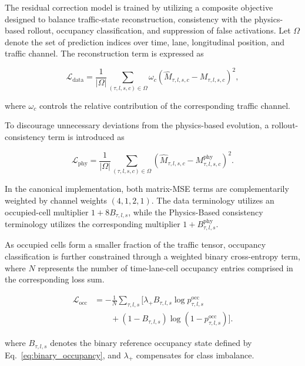 \documentclass[journal]{IEEEtran}
\begin{document}
The residual correction model is trained by utilizing a composite objective designed to balance traffic-state reconstruction, consistency with the physics-based rollout, occupancy classification, and suppression of false activations. Let $\Omega$ denote the set of prediction indices over time, lane, longitudinal position, and traffic channel. The reconstruction term is expressed as

\begin{equation}
\mathcal{L}_{\mathrm{data}}
=
\frac{1}{|\Omega|}
\sum_{(\tau,l,s,c)\in\Omega}
\omega_c
\left(
\widehat{M}_{\tau,l,s,c}
-
M_{\tau,l,s,c}
\right)^2,
\end{equation}

where $\omega_c$ controls the relative contribution of the corresponding traffic channel.

To discourage unnecessary deviations from the physics-based evolution, a rollout-consistency term is introduced as

\begin{equation}
\mathcal{L}_{\mathrm{phy}}
=
\frac{1}{|\Omega|}
\sum_{(\tau,l,s,c)\in\Omega}
\left(
\widehat{M}_{\tau,l,s,c}
-
M_{\tau,l,s,c}^{\mathrm{phy}}
\right)^2.
\end{equation}

In the canonical implementation, both matrix-MSE terms are complementarily weighted by channel weights $(4,1,2,1)$. The data terminology utilizes an occupied-cell multiplier $1+8B_{\tau,l,s}$, while the Physics-Based consistency terminology utilizes the corresponding multiplier $1+B_{\tau,l,s}^{\mathrm{phy}}$.

As occupied cells form a smaller fraction of the traffic tensor, occupancy classification is further constrained through a weighted binary cross-entropy term, where $N$ represents the number of time-lane-cell occupancy entries comprised in the corresponding loss sum.

\begin{equation}
\begin{aligned}
\mathcal{L}_{\mathrm{occ}}
&=
-
\frac{1}{N}
\sum_{\tau,l,s}
\Bigg[
\lambda_{+}
B_{\tau,l,s}
\log
p_{\tau,l,s}^{\mathrm{occ}}
\\
&\qquad+
\left(
1-B_{\tau,l,s}
\right)
\log
\left(
1-p_{\tau,l,s}^{\mathrm{occ}}
\right)
\Bigg].
\end{aligned}
\end{equation}

where $B_{\tau,l,s}$ denotes the binary reference occupancy state defined by
Eq.~\eqref{eq:binary_occupancy}, and $\lambda_{+}$ compensates for class imbalance.
\end{document}
